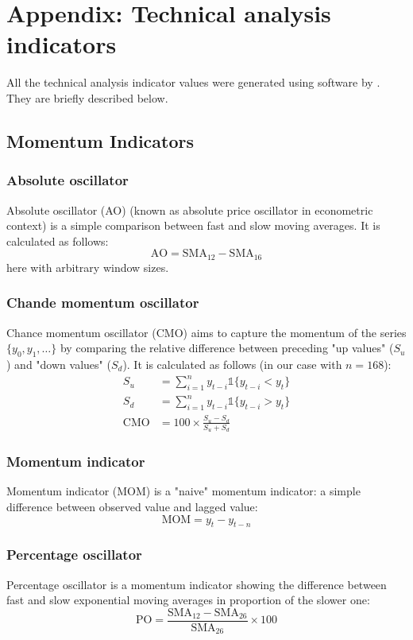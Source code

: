 \section{Appendix: Technical analysis indicators}\label{appendix_b}
\setcounter{table}{0}
\renewcommand{\thetable}{B\arabic{table}}
\setcounter{figure}{0}
\renewcommand{\thefigure}{B\arabic{figure}}

All the technical analysis indicator values were generated using software by \citet{Benediktsson}. They are briefly described below.

\subsection{Momentum Indicators}
\subsubsection{Absolute oscillator}
Absolute oscillator (AO) (known as absolute price oscillator in econometric context) is a simple comparison between fast and slow moving averages. It is calculated as follows:
    \[ \text{AO} = \text{SMA}_{12}-\text{SMA}_{16} \]
here with arbitrary window sizes.

\subsubsection{Chande momentum oscillator}
Chance momentum oscillator (CMO) aims to capture the momentum of the series $\{y_0, y_1, \dots\}$ by comparing the relative difference between preceding "up values" ($S_u$) and "down values" ($S_d$). It is calculated as follows (in our case with $n = 168$):
    \begin{align*}
        S_u &= \sum_{i=1}^{n} y_{t-i}\mathbb{1}\{y_{t-i} < y_t\} \\
        S_d &= \sum_{i=1}^{n} y_{t-i}\mathbb{1}\{y_{t-i} > y_t\} \\
        \text{CMO} &= 100 \times \frac{S_u-S_d}{S_u+S_d}
    \end{align*}
\subsubsection{Momentum indicator}
Momentum indicator (MOM) is a "naive" momentum indicator: a simple difference between observed value and lagged value:
    \[ \text{MOM} = y_t - y_{t-n} \]
\subsubsection{Percentage oscillator}
Percentage oscillator is a momentum indicator showing the difference between fast and slow exponential moving averages in proportion of the slower one:
    \[ \text{PO} = \frac{\text{SMA}_{12} - \text{SMA}_{26}}{\text{SMA}_{26}} \times 100\]
